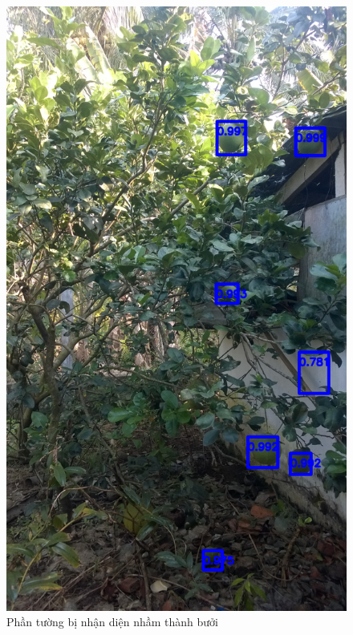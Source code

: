\begin{center}
    \begin{figure}[H]
    \centering
    \includegraphics[width=0.7\columnwidth]{images/chap3/demo_009.jpg}
    \caption{Phần tường bị nhận diện nhầm thành bưởi}
    \label{chap3:lack2}
    \end{figure}
\end{center}
